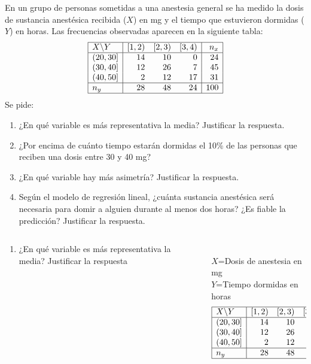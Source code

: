 \documentclass[aspectratio=149,10pt,xcolor=dvipsnames,t]{beamer}
\begin{document}
\begin{frame}[c]
En un grupo de personas sometidas a una anestesia general se ha medido
la dosis de sustancia anestésica recibida ($X$) en mg  y el tiempo que estuvieron dormidas ($Y$) en horas.
Las frecuencias observadas aparecen en la siguiente tabla:
\[
\begin{array}{|l|rrr|r|}
\hline 
X\backslash Y & [1,2) & [2,3) & [3,4) & n_x\\
\hline
(20,30] & 14 & 10 & 0 & 24\\
(30,40] & 12 & 26 & 7 & 45\\
(40,50] & 2 & 12 & 17 & 31\\
\hline
n_y & 28 & 48 & 24 & 100\\
\hline
\end{array}
\]
Se pide:
\begin{enumerate}
\item ¿En qué variable es más representativa la media? Justificar la respuesta.
\item ¿Por encima de cuánto tiempo estarán dormidas el 10\% de las personas que reciben una dosis entre 30 y 40 mg?
\item ¿En qué variable hay más asimetría? Justificar la respuesta.
\item Según el modelo de regresión lineal, ¿cuánta sustancia anestésica será necesaria para domir a alguien durante al menos dos horas?
¿Es fiable la predicción? 
Justificar la respuesta.
\end{enumerate}
\end{frame}


\begin{frame}
\begin{columns}
\begin{column}[T]{0.55\textwidth}
\begin{enumerate}
\item ¿En qué variable es más representativa la media? Justificar la respuesta
\end{enumerate}
\end{column}
\begin{column}[T]{0.45\textwidth}
\\
$X$=Dosis de anestesia en mg\\
$Y$=Tiempo dormidas en horas
\[
\begin{array}{|l|rrr|r|}
\hline 
X\backslash Y & [1,2) & [2,3) & [3,4) & n_x\\
\hline
(20,30] & 14 & 10 & 0 & 24\\
(30,40] & 12 & 26 & 7 & 45\\
(40,50] & 2 & 12 & 17 & 31\\
\hline
n_y & 28 & 48 & 24 & 100\\
\hline
\end{array}
\]
\end{column}
\end{columns}
\end{frame}
\end{document}
